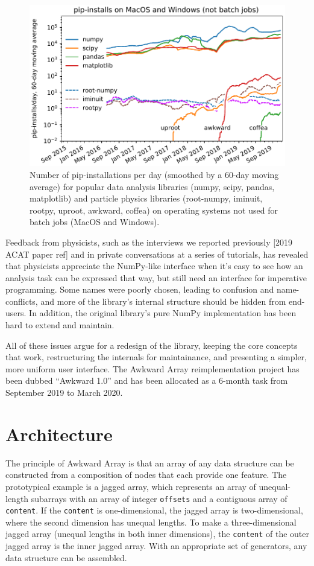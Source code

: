 \documentclass{webofc}
\begin{document}
\begin{figure}
\begin{center}
\includegraphics[width=0.75\linewidth]{pip-timeline.pdf}
\end{center}
\caption{Number of pip-installations per day (smoothed by a 60-day moving average) for popular data analysis libraries (numpy, scipy, pandas, matplotlib) and particle physics libraries (root-numpy, iminuit, rootpy, uproot, awkward, coffea) on operating systems not used for batch jobs (MacOS and Windows). \label{fig:pip-timeline}}
\end{figure}

Feedback from physicists, such as the interviews we reported previously [2019 ACAT paper ref] and in private conversations at a series of tutorials, has revealed that physicists appreciate the NumPy-like interface when it's easy to see how an analysis task can be expressed that way, but still need an interface for imperative programming. Some names were poorly chosen, leading to confusion and name-conflicts, and more of the library's internal structure should be hidden from end-users. In addition, the original library's pure NumPy implementation has been hard to extend and maintain.

All of these issues argue for a redesign of the library, keeping the core concepts that work, restructuring the internals for maintainance, and presenting a simpler, more uniform user interface. The Awkward Array reimplementation project has been dubbed ``Awkward 1.0'' and has been allocated as a 6-month task from September 2019 to March 2020.

\section{Architecture}

The principle of Awkward Array is that an array of any data structure can be constructed from a composition of nodes that each provide one feature. The prototypical example is a jagged array, which represents an array of unequal-length subarrays with an array of integer \texttt{offsets} and a contiguous array of \texttt{content}. If the \texttt{content} is one-dimensional, the jagged array is two-dimensional, where the second dimension has unequal lengths. To make a three-dimensional jagged array (unequal lengths in both inner dimensions), the \texttt{content} of the outer jagged array is the inner jagged array. With an appropriate set of generators, any data structure can be assembled.
\end{document}
